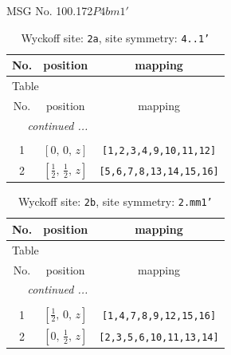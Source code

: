 \documentclass[fleqn,8pt]{jsarticle}
\begin{document}
\setcounter{MaxMatrixCols}{32}

\renewcommand{\tablename}{Table~}
\renewcommand{\figurename}{Figure~}
\begin{center}
\LARGE
MSG No. 100.172\quad$P4bm1'$
\end{center}
\renewcommand{\arraystretch}{1.2}
\begin{longtable}{ccc}
\caption{Wyckoff site: {\tt 2a}, site symmetry: {\tt 4..1'}}
 \\
 \hline \hline
No. & position & mapping \\ \hline \endfirsthead

\multicolumn{2}{l}{\tablename\ \thetable{}} \\
 \hline \hline
No. & position & mapping \\ \hline \endhead

 \hline \hline
\multicolumn{2}{r}{\footnotesize\it continued ...} \\ \endfoot

 \hline \hline
\multicolumn{2}{r}{} \\ \endlastfoot

1 & $\left[ 0,\, 0,\, z \right]$ & {\tt [1,2,3,4,9,10,11,12]} \\ \hline
2 & $\left[ \frac{1}{2},\, \frac{1}{2},\, z \right]$ & {\tt [5,6,7,8,13,14,15,16]} \\
\end{longtable}
\renewcommand{\arraystretch}{1.2}
\begin{longtable}{ccc}
\caption{Wyckoff site: {\tt 2b}, site symmetry: {\tt 2.mm1'}}
 \\
 \hline \hline
No. & position & mapping \\ \hline \endfirsthead

\multicolumn{2}{l}{\tablename\ \thetable{}} \\
 \hline \hline
No. & position & mapping \\ \hline \endhead

 \hline \hline
\multicolumn{2}{r}{\footnotesize\it continued ...} \\ \endfoot

 \hline \hline
\multicolumn{2}{r}{} \\ \endlastfoot

1 & $\left[ \frac{1}{2},\, 0,\, z \right]$ & {\tt [1,4,7,8,9,12,15,16]} \\ \hline
2 & $\left[ 0,\, \frac{1}{2},\, z \right]$ & {\tt [2,3,5,6,10,11,13,14]} \\
\end{longtable}
\end{document}
